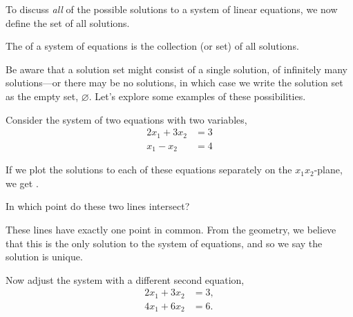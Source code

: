 \documentclass{ximera}
\begin{document}
To discuss \textit{all} of the possible solutions to a system of linear equations, we now define the set of all solutions.

\begin{definition}
  The  of a system of equations is the collection
  (or set) of all solutions.
\end{definition}

\begin{problem}
  Be aware that a solution set might consist of a single solution, of infinitely many solutions---or there may be no solutions, in which case we write the solution set as the empty set, $\varnothing$.  Let's explore some examples of these possibilities.
  
  \begin{example}
    Consider the system of two equations with two variables,
    \begin{align*}
      2x_1+3x_2&=3\\
      x_1-x_2&=4
    \end{align*}
    
    \begin{question}
      If we plot the solutions to each of these equations separately on the
      $x_{1}x_{2}$-plane, we get .
      
      \begin{question}
        In which point do these two lines intersect?
        \begin{multipleChoice}
        \end{multipleChoice}
        
        \begin{feedback}
          These lines have exactly one point in common.  From the geometry, we believe that this is the only solution to the system of equations, and so we say the solution is unique.
        \end{feedback}
      \end{question}
    \end{question}

  \end{example}

  \begin{example}
    Now adjust the system with a different second equation,
    \begin{align*}
      2x_1+3x_2&=3,\\
      4x_1+6x_2&=6.
    \end{align*}


\end{example}
\end{problem}
\end{document}
